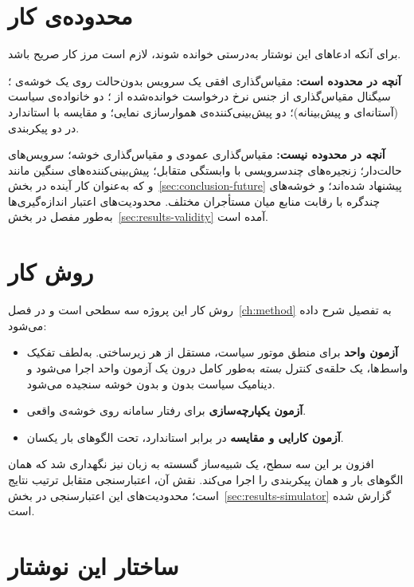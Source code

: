 \section{محدوده‌ی کار}
\label{sec:intro-scope}

برای آنکه ادعاهای این نوشتار به‌درستی خوانده شوند، لازم است مرز کار صریح باشد.

\textbf{آنچه در محدوده است:} مقیاس‌گذاری افقی یک سرویس بدون‌حالت روی یک خوشه‌ی
؛ سیگنال مقیاس‌گذاری از جنس نرخ درخواست خوانده‌شده از ؛ دو
خانواده‌ی سیاست (آستانه‌ای و پیش‌بینانه)؛ دو پیش‌بینی‌کننده‌ی هموارسازی نمایی؛ و مقایسه با
 استاندارد در دو پیکربندی.

\textbf{آنچه در محدوده نیست:} مقیاس‌گذاری عمودی و مقیاس‌گذاری خوشه؛ سرویس‌های حالت‌دار؛
زنجیره‌های چندسرویسی با وابستگی متقابل؛ پیش‌بینی‌کننده‌های سنگین مانند  و
 که به‌عنوان کار آینده در بخش~\ref{sec:conclusion-future} پیشنهاد شده‌اند؛ و
خوشه‌های چندگره با رقابت منابع میان مستأجران مختلف. محدودیت‌های اعتبار اندازه‌گیری‌ها به‌طور
مفصل در بخش~\ref{sec:results-validity} آمده است.

\section{روش کار}
\label{sec:intro-method}

روش کار این پروژه سه سطحی است و در فصل~\ref{ch:method} به تفصیل شرح داده می‌شود:

\begin{itemize}
  \item \textbf{آزمون واحد} برای منطق موتور سیاست، مستقل از هر زیرساختی. به‌لطف تفکیک
  واسط‌ها، یک حلقه‌ی کنترل \emph{بسته} به‌طور کامل درون یک آزمون واحد اجرا می‌شود و دینامیک
  سیاست بدون  و بدون خوشه سنجیده می‌شود.
  \item \textbf{آزمون یکپارچه‌سازی} برای رفتار سامانه روی خوشه‌ی واقعی.
  \item \textbf{آزمون کارایی و مقایسه} در برابر  استاندارد، تحت الگوهای بار یکسان.
\end{itemize}

افزون بر این سه سطح، یک شبیه‌ساز گسسته به زبان  نیز نگهداری شد که همان الگوهای بار
و همان پیکربندی را اجرا می‌کند. نقش آن، اعتبارسنجی متقابل ترتیب نتایج است؛ محدودیت‌های این
اعتبارسنجی در بخش~\ref{sec:results-simulator} گزارش شده است.

\section{ساختار این نوشتار}
\label{sec:intro-structure}

